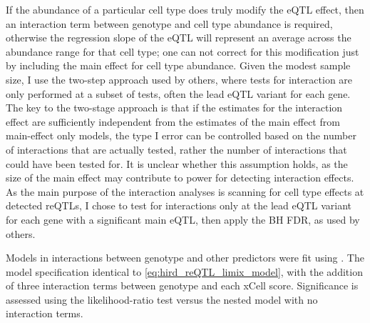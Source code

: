 If the abundance of a particular cell type does truly modify the \gls{eQTL} effect, 
then an interaction term between genotype and cell type abundance is required, 
otherwise the regression slope of the \gls{eQTL} will represent an average across the abundance range for that cell type;
one can not correct for this modification just by including the main effect for cell type abundance.
Given the modest sample size, I use the two-step approach used by others\autocite{westra2015CellSpecificEQTL,peters2016InsightGenotypePhenotypeAssociations,kim-hellmuth2017GeneticRegulatoryEffects,davenport2018DiscoveringVivoCytokineeQTL},
where tests for interaction are only performed at a subset of tests, often the lead \gls{eQTL} variant for each gene.
%
%
The key to the two-stage approach is that if the estimates for the interaction effect are sufficiently independent from the estimates of the main effect from main-effect only models,
the type I error can be controlled based on the number of interactions that are actually tested, rather the number of interactions that could have been tested for\autocite{kooperberg2008IncreasingPowerIdentifying,peters2016InsightGenotypePhenotypeAssociations}.
It is unclear whether this assumption holds, as the size of the main effect may contribute to power for detecting interaction effects.
As the main purpose of the interaction analyses is scanning for cell type effects at detected \glspl{reQTL},
I chose to test for interactions only at the lead \gls{eQTL} variant for each gene with a significant main \gls{eQTL},
then apply the \gls{BH} \gls{FDR}, as used by others\autocite{peters2016InsightGenotypePhenotypeAssociations,kim-hellmuth2017GeneticRegulatoryEffects}.

Models in interactions between genotype and other predictors were fit using .
The model specification identical to \autoref{eq:hird_reQTL_limix_model}, with the addition of three interaction terms between genotype and each xCell score.
Significance is assessed using the likelihood-ratio test versus the nested model with no interaction terms.

